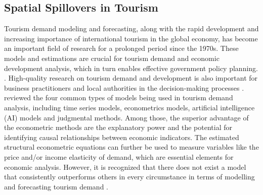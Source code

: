 \documentclass[11pt,a4paper]{amsart}
\theoremstyle{plain}
\theoremstyle{definition}
\begin{document}
\subsection{Spatial Spillovers in Tourism}\hfill\par
\noindent Tourism demand modeling and forecasting, along with the rapid development and increasing importance of international tourism in the global economy, has become an important field of research for a prolonged period since the 1970s. These models and estimations are crucial for tourism demand and economic development analysis, which in turn enables effective government policy planning. \parencite{jiaoTourismForecastingReview2019}. High-quality research on tourism demand and development is also important for business practitioners and local authorities in the decision-making processes \parencite{pengMetaAnalysisInternationalTourism2015}. \textcite{songReviewResearchTourism2019} reviewed the four common types of models being used in tourism demand analysis, including time series models, econometrics models, artificial intelligence (AI) models and judgmental methods. Among those, the superior advantage of the econometric methods are the explanatory power and the potential for identifying causal relationships between economic indicators. The estimated structural econometric equations can further be used to measure variables like the price and/or income elasticity of demand, which are essential elements for economic analysis. However, it is recognized that there does not exist a model that consistently outperforms others in every circumstance in terms of modelling and forecasting tourism demand \parencite{liRecentDevelopmentsEconometric2005, wuNewDevelopmentsTourism2017}. 
\end{document}
